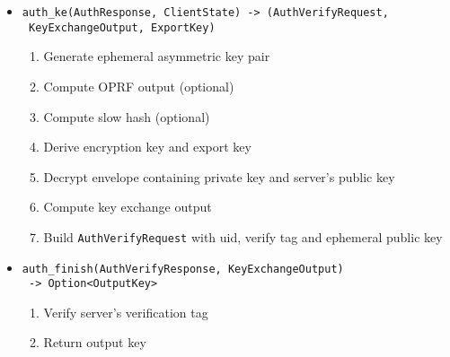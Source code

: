 ﻿\documentclass[../report.tex]{subfiles}
\begin{document}
\begin{itemize}
 \item \verb|auth_ke(AuthResponse, ClientState) -> (AuthVerifyRequest,|\\
       \verb| KeyExchangeOutput, ExportKey)|
  \begin{enumerate}
    \item Generate ephemeral asymmetric key pair
    \item Compute OPRF output (optional)
    \item Compute slow hash (optional)
    \item Derive encryption key and export key
    \item Decrypt envelope containing private key and server's public key
    \item Compute key exchange output
    \item Build \verb|AuthVerifyRequest| with uid, verify tag and ephemeral public key
  \end{enumerate}
 
 \item \verb|auth_finish(AuthVerifyResponse, KeyExchangeOutput)|\\
       \verb| -> Option<OutputKey>|
  \begin{enumerate}
    \item Verify server's verification tag
    \item Return output key
  \end{enumerate}
  
\end{itemize}
\end{document}

